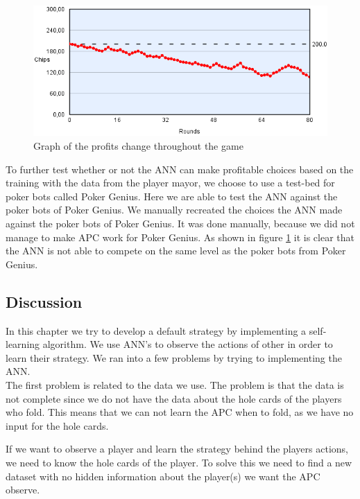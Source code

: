 \begin{figure}[H]
  \center
    \includegraphics[scale=0.6]{images/nn/finaltest.png}
  \caption{Graph of the profits change throughout the game\label{fig:finaltest}}
\end{figure}

To further test whether or not the ANN can make profitable choices based on the training with the data from the player mayor, we choose to use a test-bed for poker bots called Poker Genius. Here we are able to test the ANN against the poker bots of Poker Genius. We manually recreated the choices the ANN made against the poker bots of Poker Genius. It was done manually, because we did not manage to make APC work for Poker Genius. As shown in figure \ref{fig:finaltest} it is clear that the ANN is not able to compete on the same level as the poker bots from Poker Genius.


\subsection{Discussion}
In this chapter we try to develop a default strategy by implementing a self-learning algorithm. We use ANN's to observe the actions of other  in order to learn their strategy. We ran into a few problems by trying to implementing the ANN.\\

The first problem is related to the data we use. The problem is that  the data is not complete since we do not have the data about the hole cards of the players who fold. This means that we can not learn the APC when to fold, as we have no input for the hole cards. 

If we want to observe a player and learn the strategy behind the players actions, we need to know the hole cards of the player. To solve this we need to find a new dataset with no hidden information about the player(s) we want the APC observe.

